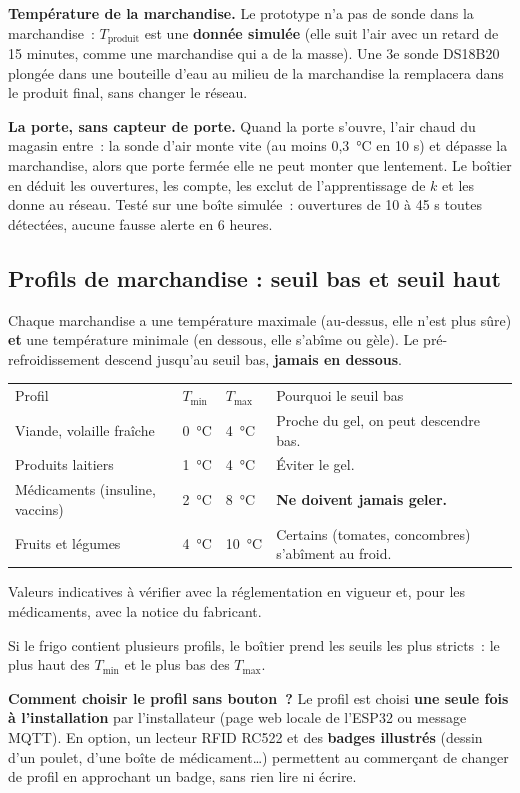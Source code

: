 \documentclass[10pt,a4paper]{article}
\begin{document}
\textbf{Température de la marchandise.} Le prototype n'a pas de sonde dans la marchandise~: $T_{\text{produit}}$ est une \textbf{donnée simulée} (elle suit l'air avec un retard de 15 minutes, comme une marchandise qui a de la masse). Une 3e sonde DS18B20 plongée dans une bouteille d'eau au milieu de la marchandise la remplacera dans le produit final, sans changer le réseau.

\textbf{La porte, sans capteur de porte.} Quand la porte s'ouvre, l'air chaud du magasin entre~: la sonde d'air monte vite (au moins 0,3~°C en 10 s) et dépasse la marchandise, alors que porte fermée elle ne peut monter que lentement. Le boîtier en déduit les ouvertures, les compte, les exclut de l'apprentissage de $k$ et les donne au réseau. Testé sur une boîte simulée~: ouvertures de 10 à 45 s toutes détectées, aucune fausse alerte en 6 heures.

\subsection{Profils de marchandise : seuil bas et seuil haut}
Chaque marchandise a une température maximale (au-dessus, elle n'est plus sûre) \textbf{et} une température minimale (en dessous, elle s'abîme ou gèle). Le pré-refroidissement descend jusqu'au seuil bas, \textbf{jamais en dessous}.

\begin{tabularx}{\linewidth}{Q{4.4cm}P{1.4cm}P{1.4cm}L}
 Profil & \mdseries $T_{\min}$ & \mdseries $T_{\max}$ & \mdseries Pourquoi le seuil bas \\
Viande, volaille fraîche & 0~°C & 4~°C & Proche du gel, on peut descendre bas. \\
Produits laitiers & 1~°C & 4~°C & Éviter le gel. \\
Médicaments (insuline, vaccins) & 2~°C & 8~°C & \textbf{Ne doivent jamais geler.} \\
Fruits et légumes & 4~°C & 10~°C & Certains (tomates, concombres) s'abîment au froid. \\
\end{tabularx}

{\small Valeurs indicatives à vérifier avec la réglementation en vigueur et, pour les médicaments, avec la notice du fabricant.}

Si le frigo contient plusieurs profils, le boîtier prend les seuils les plus stricts~: le plus haut des $T_{\min}$ et le plus bas des $T_{\max}$.

\textbf{Comment choisir le profil sans bouton~?} Le profil est choisi \textbf{une seule fois à l'installation} par l'installateur (page web locale de l'ESP32 ou message MQTT). En option, un lecteur RFID RC522 et des \textbf{badges illustrés} (dessin d'un poulet, d'une boîte de médicament\ldots) permettent au commerçant de changer de profil en approchant un badge, sans rien lire ni écrire.
\end{document}
